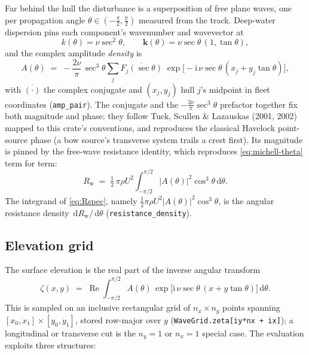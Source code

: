 \documentclass[11pt]{article}
\newcommand{\ii}{\mathrm{i}}
\newcommand{\dd}{\,\mathrm{d}}
\newcommand{\Rw}{R_{\mathrm{w}}}
\begin{document}
Far behind the hull the disturbance is a superposition of free plane waves, one
per propagation angle $\theta \in (-\tfrac\pi2, \tfrac\pi2)$ measured from the
track. Deep-water dispersion pins each component's wavenumber and wavevector at
\begin{equation}
  k(\theta) = \nu\sec^{2}\theta,
  \qquad
  \mathbf{k}(\theta) = \nu\sec\theta\,(1, \tan\theta),
\end{equation}
and the complex amplitude \emph{density} is
\begin{equation}
  \boxed{\;
  A(\theta) \;=\; -\frac{2\nu}{\pi}\,\sec^{3}\theta
    \sum_{j} \overline{F_j(\sec\theta)}\;
      \exp\!\bigl[-\ii\,\nu\sec\theta\,(x_j + y_j\tan\theta)\bigr],
  \;}
  \label{eq:Adef}
\end{equation}
with $\overline{(\cdot)}$ the complex conjugate and $(x_j, y_j)$ hull $j$'s
midpoint in fleet coordinates (\texttt{amp\_pair}). The
conjugate and the $-\tfrac{2\nu}{\pi}\sec^{3}\theta$ prefactor together fix both
magnitude and phase: they follow Tuck, Scullen \& Lazauskas (2001, 2002) mapped to this crate's
conventions, and reproduces the classical Havelock point-source phase (a bow
source's transverse system trails a crest first). Its magnitude is pinned by the
free-wave resistance identity, which reproduces \eqref{eq:michell-theta} term for
term:
\begin{equation}
  \Rw \;=\; \tfrac12\,\pi\rho U^{2}
    \int_{-\pi/2}^{\pi/2} |A(\theta)|^{2}\cos^{3}\theta \dd\theta .
  \label{eq:Rspec}
\end{equation}
The integrand of \eqref{eq:Rspec}, namely
$\tfrac12\pi\rho U^{2}|A(\theta)|^{2}\cos^{3}\theta$, is the angular
resistance density $\dd\Rw/\dd\theta$ (\texttt{resistance\_density}).

\subsection{Elevation grid}

The surface elevation is the real part of the inverse angular transform
\begin{equation}
  \zeta(x, y) \;=\; \operatorname{Re}
    \int_{-\pi/2}^{\pi/2} A(\theta)\,
      \exp\!\bigl[\ii\,\nu\sec\theta\,(x + y\tan\theta)\bigr]\dd\theta .
  \label{eq:zeta}
\end{equation}
This is sampled on an inclusive rectangular grid of $n_x \times n_y$ points
spanning $[x_0, x_1] \times [y_0, y_1]$, stored row-major over $y$
(\texttt{WaveGrid.zeta[iy*nx + ix]}); a longitudinal or transverse cut is the
$n_y = 1$ or $n_x = 1$ special case. The evaluation exploits three structures:
\end{document}
